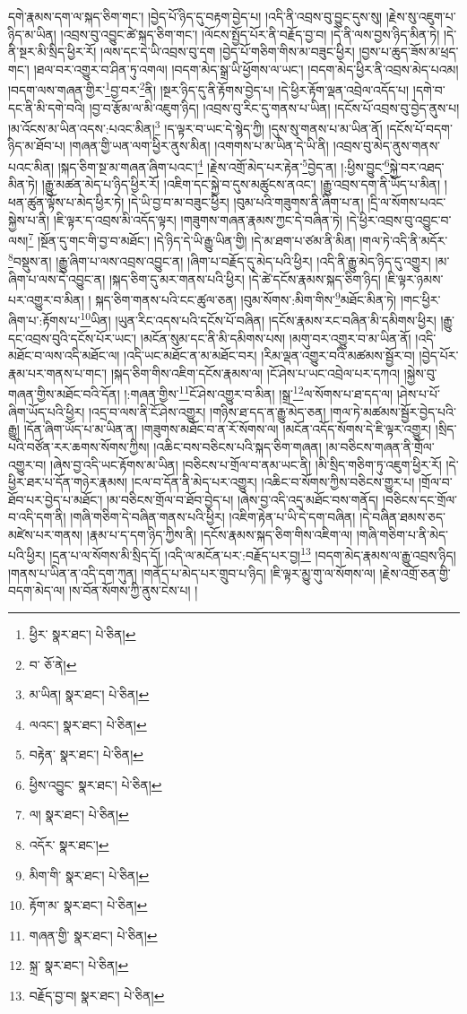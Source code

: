 དགེ་རྣམས་དག་ལ་སྐད་ཅིག་གང་། །བྱེད་པོ་ཉིད་དུ་བརྟག་བྱེད་པ། །འདི་ནི་འབྲས་བུ་བྱུང་དུས་སུ། །རྗེས་སུ་འཇུག་པ་ཉིད་མ་ཡིན། །འབྲས་བུ་འབྱུང་ཚེ་སྐད་ཅིག་གང་། །ལོངས་སྤྱོད་པོར་ནི་བརྗོད་བྱ་བ། །དེ་ནི་ལས་བྱས་ཉིད་མིན་ཏེ། །དེ་ནི་སྔར་མི་སྲིད་ཕྱིར་རོ། །ལས་དང་དེ་ཡི་འབྲས་བུ་དག །བྱེད་པོ་གཅིག་གིས་མ་བཟུང་ཕྱིར། །བྱས་པ་ཆུད་ཟོས་མ་ཕྲད་གང་། །ཐལ་བར་འགྱུར་བ་ཤིན་ཏུ་འགལ། །བདག་མེད་སྒྲ་ཡི་ཕྱོགས་ལ་ཡང་། །བདག་མེད་ཕྱིར་ནི་འབྲས་མེད་པའམ། །བདག་ལས་གཞན་གྱིར་\footnote{ཕྱིར་  སྣར་ཐང་།  པེ་ཅིན། }བྱ་བར་\footnote{བ་  ཅོ་ནེ། }ནི། །སྔར་ཉིད་དུ་ནི་རྟོགས་བྱེད་པ། །དེ་ཕྱིར་རྟོག་ལྡན་འབྲེལ་འདོད་པ། །དགེ་བ་དང་ནི་མི་དགེ་བའི། །བྱ་བ་རྩོམ་ལ་མི་འཇུག་ཉིད། །འབྲས་བུ་རིང་དུ་གནས་པ་ཡིན། །དངོས་པོ་འབྲས་བུ་བྱེད་ནུས་པ། །མ་འོངས་མ་ཡིན་འདས་:པའང་མིན།\footnote{མ་ཡིན།  སྣར་ཐང་།  པེ་ཅིན། } །ད་ལྟར་བ་ཡང་དེ་སྙེད་ཀྱི། །དུས་སུ་གནས་པ་མ་ཡིན་ནོ། །དངོས་པོ་བདག་ཉིད་མ་ཐོབ་པ། །གཞན་གྱི་ཡན་ལག་ཕྱིར་ནུས་མིན། །འགགས་པ་མ་ཡིན་དེ་ཡི་ནི། །འབྲས་བུ་མེད་ནུས་གནས་པའང་མིན། །སྐད་ཅིག་སྔ་མ་གཞན་ཞིག་པའང་།\footnote{ལའང་།  སྣར་ཐང་།  པེ་ཅིན། } །རྗེས་འགྲོ་མེད་པར་རྟེན་\footnote{བརྟེན་  སྣར་ཐང་།  པེ་ཅིན། }བྱེད་ན། །:ཕྱིས་བྱུང་\footnote{ཕྱིས་འབྱུང་  སྣར་ཐང་།  པེ་ཅིན། }སྐྱེ་བར་འཐད་མིན་ཏེ། །རྒྱུ་མཚན་མེད་པ་ཉིད་ཕྱིར་རོ། །འཇིག་དང་སྐྱེ་བ་དུས་མཚུངས་ནའང་། །རྒྱུ་འབྲས་དག་ནི་ཡོད་པ་མིན། །ཕན་ཚུན་ལྟོས་པ་མེད་ཕྱིར་ཏེ། །དེ་ཡི་བྱ་བ་མ་བཟུང་ཕྱིར། །བུམ་པའི་གཟུགས་ནི་ཞིག་པ་ན། །དྲི་ལ་སོགས་པའང་སྐྱེས་པ་ནི། །ཇི་ལྟར་ད་འབྲས་མི་འདོད་ལྟར། །གཟུགས་གཞན་རྣམས་ཀྱང་དེ་བཞིན་ཏེ། །དེ་ཕྱིར་འབྲས་བུ་འབྱུང་བ་ལས།\footnote{ལ།  སྣར་ཐང་།  པེ་ཅིན། } །སྔོན་དུ་གང་གི་བྱ་བ་མཐོང་། །དེ་ཉིད་དེ་ཡི་རྒྱུ་ཡིན་གྱི། །དེ་མ་ཐག་པ་ཙམ་ནི་མིན། །གལ་ཏེ་འདི་ནི་མདོར་\footnote{འདོར་  སྣར་ཐང་། }བསྡུས་ན། །རྒྱུ་ཞིག་པ་ལས་འབྲས་འབྱུང་ན། །ཞིག་པ་བརྗོད་དུ་མེད་པའི་ཕྱིར། །འདི་ནི་རྒྱུ་མེད་ཉིད་དུ་འགྱུར། །མ་ཞིག་པ་ལས་དེ་འབྱུང་ན། །སྐད་ཅིག་དུ་མར་གནས་པའི་ཕྱིར། །དེ་ཚེ་དངོས་རྣམས་སྐད་ཅིག་ཉིད། །ཇི་ལྟར་ཉམས་པར་འགྱུར་བ་མིན། །
སྐད་ཅིག་གནས་པའི་ངང་ཚུལ་ཅན། །བུམ་སོགས་:མིག་གིས་\footnote{མིག་གི་  སྣར་ཐང་།  པེ་ཅིན། }མཐོང་མིན་ཏེ། །གང་ཕྱིར་ཞིག་པ་:རྟོགས་པ་\footnote{རྟོག་མ་  སྣར་ཐང་།  པེ་ཅིན། }ཡིན། །ཡུན་རིང་འདས་པའི་དངོས་པོ་བཞིན། །དངོས་རྣམས་རང་བཞིན་མི་དམིགས་ཕྱིར། །རྒྱུ་དང་འབྲས་བུའི་དངོས་པོར་ཡང་། །མངོན་སུམ་དང་ནི་མི་དམིགས་པས། །མགུ་བར་འགྱུར་བ་མ་ཡིན་ནོ། །འདི་མཐོང་བ་ལས་འདི་མཐོང་ལ། །འདི་ཡང་མཐོང་ན་མ་མཐོང་བར། །རིམ་ལྡན་འགྱུར་བའི་མཚམས་སྦྱོར་བ། །བྱེད་པོར་རྣམ་པར་གནས་པ་གང་། །སྐད་ཅིག་གིས་འཇིག་དངོས་རྣམས་ལ། །ངོ་ཤེས་པ་ཡང་འབྲེལ་པར་དཀའ། །སྐྱེས་བུ་གཞན་གྱིས་མཐོང་བའི་དོན། །:གཞན་གྱིས་\footnote{གཞན་གྱི་  སྣར་ཐང་།  པེ་ཅིན། }ངོ་ཤེས་འགྱུར་བ་མིན། །སྒྲ་\footnote{སྐྲ་  སྣར་ཐང་།  པེ་ཅིན། }ལ་སོགས་པ་ཐ་དད་ལ། །ཤེས་པ་པོ་ཞིག་ཡོད་པའི་ཕྱིར། །འདྲ་བ་ལས་ནི་ངོ་ཤེས་འགྱུར། །གཉིས་ཐ་དད་ན་རྒྱུ་མེད་ཅན། །གལ་ཏེ་མཚམས་སྦྱོར་བྱེད་པའི་རྒྱུ། །དོན་ཞིག་ཡོད་པ་མ་ཡིན་ན། །གཟུགས་མཐོང་བ་ན་རོ་སོགས་ལ། །མངོན་འདོད་སོགས་དེ་ཇི་ལྟར་འགྱུར། །སྲིད་པའི་བཙོན་རར་ཆགས་སོགས་ཀྱིས། །འཆིང་བས་བཅིངས་པའི་སྐད་ཅིག་གཞན། །མ་བཅིངས་གཞན་ནི་གྲོལ་འགྱུར་བ། །ཞེས་བྱ་འདི་ཡང་རྟོགས་མ་ཡིན། །བཅིངས་པ་གྲོལ་བ་ནམ་ཡང་ནི། །མི་སྲིད་གཅིག་ཏུ་འཇུག་ཕྱིར་རོ། །དེ་ཕྱིར་ཐར་པ་དོན་གཉེར་རྣམས། །ངལ་བ་དོན་ནི་མེད་པར་འགྱུར། །འཆིང་བ་སོགས་ཀྱིས་བཅིངས་གྱུར་པ། །གྲོལ་བ་ཐོབ་པར་བྱེད་པ་མཐོང་། །མ་བཅིངས་གྲོལ་བ་ཐོབ་བྱེད་པ། །ཞེས་བྱ་འདི་འདྲ་མཐོང་བས་གནོད། །བཅིངས་དང་གྲོལ་བ་འདི་དག་ནི། །གཞི་གཅིག་དེ་བཞིན་གནས་པའི་ཕྱིར། །འཇིག་རྟེན་པ་ཡི་དེ་དག་བཞིན། །དེ་བཞིན་ཐམས་ཅད་མཛེས་པར་གནས། །རྣམ་པ་ད་དག་ཉིད་ཀྱིས་ནི། །དངོས་རྣམས་སྐད་ཅིག་གིས་འཇིག་ལ། །གཞི་གཅིག་པ་ནི་མེད་པའི་ཕྱིར། །དྲན་པ་ལ་སོགས་མི་སྲིད་དོ། །འདི་ལ་མངོན་པར་:བརྗོད་པར་བྱ།\footnote{བརྗོད་བྱ་བ།  སྣར་ཐང་།  པེ་ཅིན། } །བདག་མེད་རྣམས་ལ་རྒྱུ་འབྲས་ཉིད། །གནས་པ་ཡིན་ན་འདི་དག་ཀུན། །གནོད་པ་མེད་པར་གྲུབ་པ་ཉིད། །ཇི་ལྟར་མྱུ་གུ་ལ་སོགས་ལ། །རྗེས་འགྲོ་ཅན་གྱི་བདག་མེད་ལ། །ས་བོན་སོགས་ཀྱི་ནུས་ངེས་པ། །
